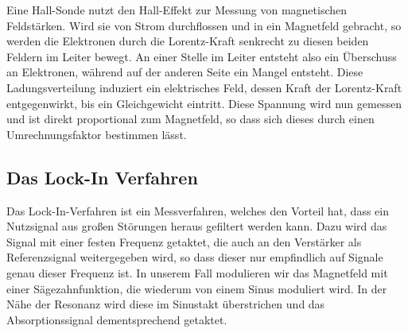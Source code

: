 Eine Hall-Sonde nutzt den Hall-Effekt zur Messung von magnetischen Feldstärken. Wird sie von Strom durchflossen und in ein Magnetfeld gebracht, so werden die Elektronen durch die Lorentz-Kraft senkrecht zu diesen beiden Feldern im Leiter bewegt. An einer Stelle im Leiter entsteht also ein Überschuss an Elektronen, während auf der anderen Seite ein Mangel entsteht. Diese Ladungsverteilung induziert ein elektrisches Feld, dessen Kraft der Lorentz-Kraft entgegenwirkt, bis ein Gleichgewicht eintritt. Diese Spannung wird nun gemessen und ist direkt proportional zum Magnetfeld, so dass sich dieses durch einen Umrechnungsfaktor bestimmen lässt.

\subsection{Das Lock-In Verfahren}

Das Lock-In-Verfahren ist ein Messverfahren, welches den Vorteil hat, dass ein Nutzsignal aus großen Störungen heraus gefiltert werden kann. Dazu wird das Signal mit einer festen Frequenz getaktet, die auch an den Verstärker als Referenzsignal weitergegeben wird, so dass dieser nur empfindlich auf Signale genau dieser Frequenz ist.
In unserem Fall modulieren wir das Magnetfeld mit einer Sägezahnfunktion, die wiederum von einem Sinus moduliert wird. In der Nähe der Resonanz wird diese im Sinustakt überstrichen und das Absorptionssignal dementsprechend getaktet.
